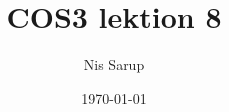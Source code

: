 \documentclass[a4wide,10pt]{article}
\begin{document}
\title{COS3 lektion 8}
\author{Nis Sarup}
\date{\today}
\maketitle


\addtocounter{section}{7}
\end{document}
